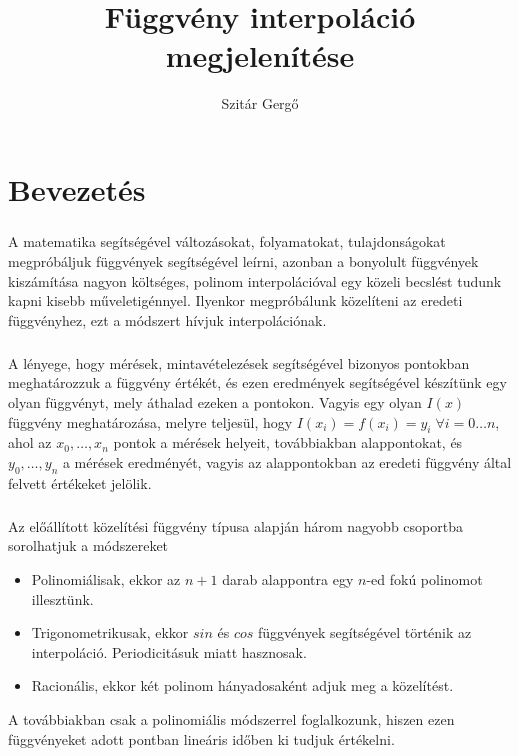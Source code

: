 \documentclass{elteikthesis}
\title{Függvény interpoláció megjelenítése}
\author{Szitár Gergő}
\begin{document}
\frontmatter

	\maketitle
	\tableofcontents
	
\mainmatter

\chapter{Bevezetés}
\paragraph{}
A matematika segítségével változásokat, folyamatokat, tulajdonságokat megpróbáljuk függvények segítségével leírni, azonban a bonyolult függvények kiszámítása nagyon költséges, polinom interpolációval egy közeli becslést tudunk kapni kisebb műveletigénnyel. Ilyenkor megpróbálunk közelíteni az eredeti függvényhez, ezt a módszert hívjuk interpolációnak.
\paragraph{}
A lényege, hogy mérések, mintavételezések segítségével bizonyos pontokban meghatározzuk a függvény értékét, és ezen eredmények segítségével készítünk egy olyan függvényt, mely áthalad ezeken a pontokon. Vagyis egy olyan $I(x)$ függvény meghatározása, melyre teljesül, hogy $I(x_i)=f(x_i)=y_i \; \forall i = 0 \dots n$, ahol az $x_0, \dots, x_n$ pontok a mérések helyeit, továbbiakban alappontokat, és $y_0, \dots, y_n$ a mérések eredményét, vagyis az alappontokban az eredeti függvény által felvett értékeket jelölik.
\paragraph{}
Az előállított közelítési függvény típusa alapján három nagyobb csoportba sorolhatjuk a módszereket
\begin{itemize}
\item Polinomiálisak, ekkor az $n+1$ darab alappontra egy $n$-ed fokú polinomot illesztünk.
\item Trigonometrikusak, ekkor $sin$ és $cos$ függvények segítségével történik az interpoláció. Periodicitásuk miatt hasznosak.
\item Racionális, ekkor két polinom hányadosaként adjuk meg a közelítést.
\end{itemize}
A továbbiakban csak a polinomiális módszerrel foglalkozunk, hiszen ezen függvényeket adott pontban lineáris időben ki tudjuk értékelni.
\end{document}
